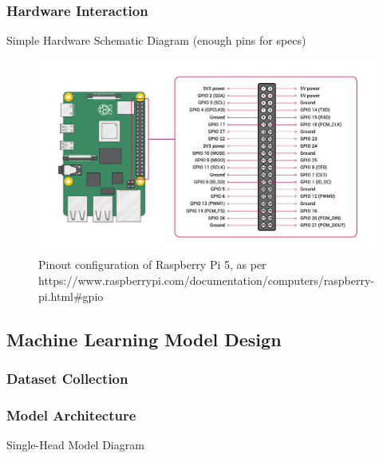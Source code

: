             \subsubsection{Hardware Interaction}
    
                \begin{temp}
                    Simple Hardware Schematic Diagram (enough pins for specs)
                \end{temp}
    
                \begin{figure}[htbp]
                    \centering
                    \includegraphics[width=\linewidth]{images/raspberry-pi-5-pinout.png}
                    \caption{Pinout configuration of Raspberry Pi 5, as per https://www.raspberrypi.com/documentation/computers/raspberry-pi.html#gpio}
                    \label{fig:RPi5Pinout}
                \end{figure}
        
        \subsection{Machine Learning Model Design}
            \subsubsection{Dataset Collection}
        
            \subsubsection{Model Architecture}
                \begin{temp}
                    Single-Head Model Diagram
                \end{temp}
    
